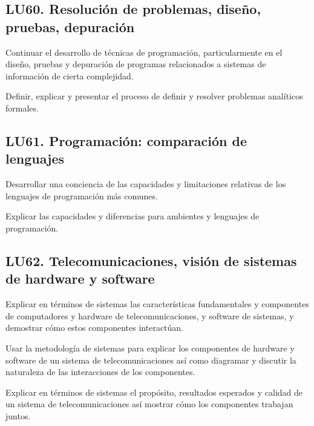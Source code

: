 \subsection{LU60. Resolución de problemas, diseño, pruebas, depuración}\label{sec:LU60}
\begin{LearningUnit}
\begin{LUGoal}
\item Continuar el desarrollo de técnicas de programación, particularmente en el diseño, pruebas y depuración de programas relacionados a sistemas de información de cierta complejidad.
\end{LUGoal}

\begin{LUObjective}
\item Definir, explicar y presentar el proceso de definir y resolver problemas analíticos formales.
\end{LUObjective}
\end{LearningUnit}

\subsection{LU61. Programación: comparación de lenguajes}\label{sec:LU61}
\begin{LearningUnit}
\begin{LUGoal}
\item Desarrollar una conciencia de las capacidades y limitaciones relativas de los lenguajes de programación más comunes.
\end{LUGoal}

\begin{LUObjective}
\item Explicar las capacidades y diferencias para ambientes y lenguajes de programación.
\end{LUObjective}
\end{LearningUnit}

\subsection{LU62. Telecomunicaciones, visión de sistemas de hardware y software}\label{sec:LU62}
\begin{LearningUnit}
\begin{LUGoal}
\item Explicar en términos de sistemas las características fundamentales y componentes de computadores y hardware de telecomunicaciones, y software de sistemas, y demostrar cómo estos componentes interactúan.
\end{LUGoal}

\begin{LUObjective}
\item Usar la metodología de sistemas para explicar los componentes de hardware y software de un sistema de telecomunicaciones así como diagramar y discutir la naturaleza de las interacciones de los componentes.
\item Explicar en términos de sistemas el propósito, resultados esperados y calidad de un sistema de telecomunicaciones así mostrar cómo los componentes trabajan juntos.
\end{LUObjective}
\end{LearningUnit}

